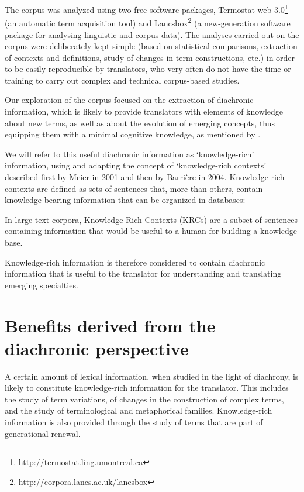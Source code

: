 \documentclass[output=paper]{langscibook}
\begin{document}
The corpus was analyzed using two free software packages, Termostat web 3.0\footnote{\url{http://termostat.ling.umontreal.ca}} (an automatic term acquisition tool) and Lancsbox\footnote{\url{http://corpora.lancs.ac.uk/lancsbox}} (a new-generation software package for analysing linguistic and corpus data). The analyses carried out on the corpus were deliberately kept simple (based on statistical comparisons, extraction of contexts and definitions, study of changes in term constructions, etc.) in order to be easily reproducible by translators, who very often do not have the time or training to carry out complex and technical corpus-based studies.

Our exploration of the corpus focused on the extraction of diachronic information, which is likely to provide translators with elements of knowledge about new terms, as well as about the evolution of emerging concepts, thus equipping them with a minimal cognitive knowledge, as mentioned by \citet{Vandaele2001}.

We will refer to this useful diachronic information as ‘knowledge-rich’ information, using and adapting the concept of ‘knowledge-rich contexts’ described first by Meier in 2001 and then by Barrière in 2004. Knowledge-rich contexts are defined as sets of sentences that, more than others, contain knowledge-bearing information that can be organized in databases:

In large text corpora, Knowledge-Rich Contexts (KRCs) are a subset of sentences containing information that would be useful to a human for building a knowledge base. \citep[188]{Barrière2004}

Knowledge-rich information is therefore considered to contain diachronic information that is useful to the translator for understanding and translating emerging specialties.

\section{Benefits derived from the diachronic perspective}

A certain amount of lexical information, when studied in the light of diachrony, is likely to constitute knowledge-rich information for the translator. This includes the study of term variations, of changes in the construction of complex terms, and the study of terminological and metaphorical families. Knowledge-rich information is also provided through the study of terms that are part of generational renewal.
\end{document}
